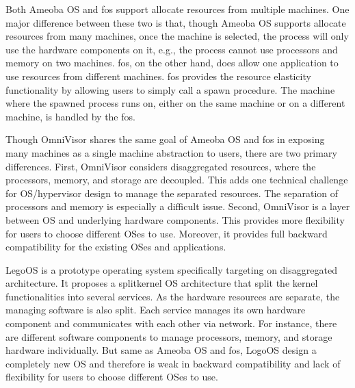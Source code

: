 \documentclass[twocolumn]{article}
\begin{document}
    Both Ameoba OS and fos support allocate resources from multiple machines. One major difference between these two is that, though Ameoba OS supports allocate resources from many machines, once the machine is selected, the process will only use the hardware components on it, e.g., the process cannot use processors and memory on two machines.  fos, on the other hand, does allow one application to use resources from different machines. fos provides the resource elasticity functionality by allowing users to simply call a spawn procedure. The machine where the spawned process runs on, either on the same machine or on a different machine, is handled by the fos. \par
    Though OmniVisor shares the same goal of Ameoba OS and fos in exposing many machines as a single machine abstraction to users, there are two primary differences. First, OmniVisor considers disaggregated resources, where the processors, memory, and storage are decoupled. This adds one technical challenge for OS/hypervisor design to manage the separated resources. The separation of processors and memory is especially a difficult issue. Second, OmniVisor is a layer between OS and underlying hardware components. This provides more flexibility for users to choose different OSes to use. Moreover, it provides full backward compatibility for the existing OSes and applications. \par
    LegoOS\cite{LegoOS} is a prototype operating system specifically targeting on disaggregated architecture. It proposes a splitkernel OS architecture that split the kernel functionalities into several services. As the hardware resources are separate, the managing software is also split. Each service manages its own hardware component and communicates with each other via network. For instance, there are different software components to manage processors, memory, and storage hardware individually. But same as Ameoba OS and fos, LogoOS design a completely new OS and therefore is weak in backward compatibility and lack of flexibility for users to choose different OSes to use. \par
\end{document}
